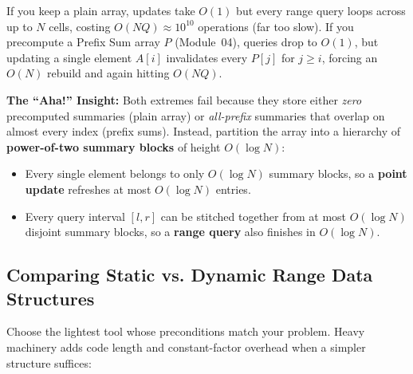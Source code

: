 \documentclass[11pt,a4paper]{article}
\theoremstyle{definition}
\newcommand{\ahabeat}{\textbf{\color{accentteal}The ``Aha!'' Insight:} }
\begin{document}
If you keep a plain array, updates take $O(1)$ but every range query loops across up to $N$ cells, costing $O(NQ) \approx 10^{10}$ operations (far too slow). If you precompute a Prefix Sum array $P$ (Module~04), queries drop to $O(1)$, but updating a single element $A[i]$ invalidates every $P[j]$ for $j \ge i$, forcing an $O(N)$ rebuild and again hitting $O(NQ)$.

\ahabeat Both extremes fail because they store either \emph{zero} precomputed summaries (plain array) or \emph{all-prefix} summaries that overlap on almost every index (prefix sums). Instead, partition the array into a hierarchy of \textbf{power-of-two summary blocks} of height $O(\log N)$:
\begin{itemize}
    \item Every single element belongs to only $O(\log N)$ summary blocks, so a \textbf{point update} refreshes at most $O(\log N)$ entries.
    \item Every query interval $[l, r]$ can be stitched together from at most $O(\log N)$ disjoint summary blocks, so a \textbf{range query} also finishes in $O(\log N)$.
\end{itemize}

\subsection{Comparing Static vs. Dynamic Range Data Structures}

Choose the lightest tool whose preconditions match your problem. Heavy machinery adds code length and constant-factor overhead when a simpler structure suffices:
\end{document}
